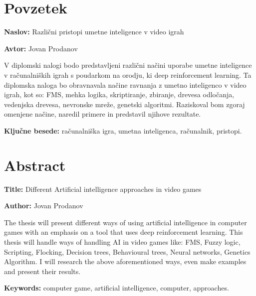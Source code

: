 \documentclass[a4paper, 12pt]{book}
\newcommand{\ttitle}{Različni pristopi umetne inteligence v video igrah}
\newcommand{\ttitleEn}{Different Artificial intelligence approaches in video games}
\newcommand{\tauthor}{Jovan Prodanov}
\newcommand{\tkeywords}{računalniška igra, umetna inteligenca, računalnik, pristopi}
\newcommand{\tkeywordsEn}{computer game, artificial intelligence, computer, approaches}
\newcommand{\clearemptydoublepage}{\newpage{\pagestyle{empty}\cleardoublepage}}
\begin{document}
\clearemptydoublepage


\chapter*{Povzetek}

\noindent\textbf{Naslov:} \ttitle
\bigskip

\noindent\textbf{Avtor:} \tauthor
\bigskip

\noindent 
V diplomski nalogi bodo predstavljeni različni načini uporabe umetne inteligence v računalniških igrah s poudarkom na orodju, ki deep reinforcement learning.
Ta diplomska naloga bo obravnavala načine ravnanja z umetno inteligenco v video igrah, kot so: FMS, mehka logika, skriptiranje, zbiranje, drevesa odločanja, vedenjska drevesa, nevronske mreže, genetski algoritmi.
Raziskoval bom zgoraj omenjene načine, naredil primere in predstavil njihove rezultate.
\bigskip

\noindent\textbf{Ključne besede:} \tkeywords.
\clearemptydoublepage



\chapter*{Abstract}

\noindent\textbf{Title:} \ttitleEn
\bigskip

\noindent\textbf{Author:} \tauthor
\bigskip

\noindent 
The thesis will present different ways of using artificial intelligence in computer games with an emphasis on a tool that uses deep reinforcement learning.
This thesis will handle ways of handling AI in video games like: FMS, Fuzzy logic, Scripting, Flocking, Decision trees, Behavioural trees, Neural networks, Genetics Algorithm.
I will research the above aforementioned ways, even make examples and present their results.
\bigskip



\noindent\textbf{Keywords:} \tkeywordsEn.
\clearemptydoublepage
\end{document}
